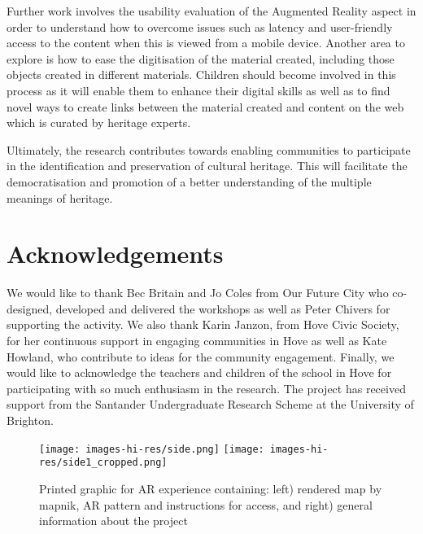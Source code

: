 \documentclass{egpubl}
\begin{document}
Further work involves the usability evaluation of the Augmented Reality aspect
in order to understand how to overcome issues such as latency and
user-friendly access to the content when this is viewed from a mobile device.
Another area to explore is how to ease the digitisation of the material
created, including those objects created in different materials. Children should
become involved in this process as it will enable them to enhance their digital
skills as well as to find novel ways to create links between the material created and
content on the web which is curated by heritage experts. 



Ultimately, the research contributes towards enabling communities to
participate in the identification and preservation of cultural heritage. This will 
 facilitate the democratisation and promotion of a better understanding
of the multiple meanings of heritage.


\section{Acknowledgements} We would like to thank Bec Britain and Jo Coles
from Our Future City who co-designed, developed and delivered the workshops as
well as Peter Chivers for supporting the activity. We also thank Karin Janzon,
from Hove Civic Society, for her continuous support in engaging communities in
Hove as well as Kate Howland, who contribute to ideas for the community engagement. 
Finally, we would like to acknowledge the teachers and children of the
school in Hove for participating with so much enthusiasm in the research. 
The project has received support from the Santander Undergraduate Research Scheme
at the University of Brighton.

\balance



%


 

\newpage \begin{figure*}[ht] \centering
\texttt{[image: images-hi-res/side.png]}
\texttt{[image: images-hi-res/side1\_cropped.png]}
\caption{Printed graphic for AR experience containing: left) rendered map by
mapnik, AR pattern and instructions for access, and right) general information
about the project} \label{fig:print} \end{figure*}
\end{document}
